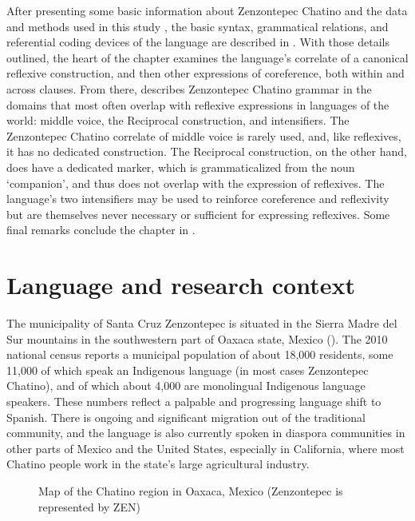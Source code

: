 \documentclass[output=paper]{../langscibook}
\begin{document}
After presenting some basic information about Zenzontepec Chatino and the data and methods used in this study , the basic syntax, grammatical relations, and referential coding devices of the language are described in . With those details outlined, the heart of the chapter  examines the language’s correlate of a canonical reflexive construction, and then other expressions of coreference, both within and across clauses. From there,  describes Zenzontepec Chatino grammar in the domains that most often overlap with reflexive expressions in languages of the world: middle voice, the Reciprocal construction, and intensifiers. The Zenzontepec Chatino correlate of middle voice is rarely used, and, like reflexives, it has no dedicated construction. The Reciprocal construction, on the other hand, does have a dedicated marker, which is grammaticalized from the noun ‘companion’, and thus does not overlap with the expression of reflexives. The language’s two intensifiers may be used to reinforce coreference and reflexivity but are themselves never necessary or sufficient for expressing reflexives. Some final remarks conclude the chapter in .


\section{Language and research context}
\label{sec:campbell:2}

The municipality of Santa Cruz Zenzontepec is situated in the Sierra Madre del Sur mountains in the southwestern part of Oaxaca state, Mexico (). The 2010 national census \citep{INEGI2010} reports a municipal population of about 18,000 residents, some 11,000 of which speak an Indigenous language (in most cases Zenzontepec Chatino), and of which about 4,000 are monolingual Indigenous language speakers. These numbers reflect a palpable and progressing language shift to Spanish. There is ongoing and significant migration out of the traditional community, and the language is also currently spoken in diaspora communities in other parts of Mexico and the United States, especially in California, where most Chatino people work in the state’s large agricultural industry.


\begin{figure}
\caption{Map of the Chatino region in Oaxaca, Mexico (Zenzontepec is represented by ZEN)}
\label{fig:campbell:1}
\end{figure}
\end{document}
